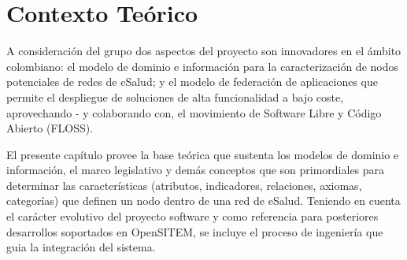 \chapter{Contexto Teórico}

A consideración del grupo dos aspectos del proyecto son innovadores en el ámbito colombiano: el modelo de dominio e información para la caracterización de nodos potenciales de redes de eSalud; y el modelo de federación de aplicaciones que permite el despliegue de soluciones de alta funcionalidad a bajo coste, aprovechando - y colaborando con, el movimiento de Software Libre y Código Abierto (FLOSS).

El presente capítulo provee la base teórica que sustenta los modelos de dominio e información, el marco legislativo y demás conceptos que son primordiales para determinar las características (atributos, indicadores, relaciones, axiomas, categorías) que definen un nodo dentro de una red de eSalud. Teniendo en cuenta el carácter evolutivo del proyecto software y como referencia para posteriores desarrollos soportados en  OpenSITEM, se incluye el proceso de ingeniería que guia la integración del sistema.






